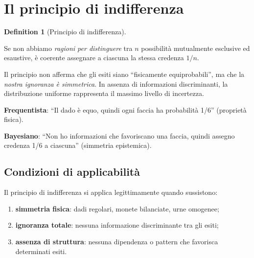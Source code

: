 \documentclass[
  letterpaper,
  DIV=11,
  numbers=noendperiod,
  oneside]{scrreprt}
\providecommand{\tightlist}{%
  \setlength{\itemsep}{0pt}\setlength{\parskip}{0pt}}
\theoremstyle{definition}
\theoremstyle{plain}
\theoremstyle{definition}
\newtheorem{definition}{Definition}[chapter]
\theoremstyle{remark}
\begin{document}
\section{Il principio di
indifferenza}\label{il-principio-di-indifferenza}

\begin{definition}[Principio di
indifferenza]\protect\hypertarget{def-principle-indifference}{}\label{def-principle-indifference}

Se non abbiamo \emph{ragioni per distinguere} tra \(n\) possibilità
mutualmente esclusive ed esaustive, è coerente assegnare a ciascuna la
stessa credenza \(1/n\).

\end{definition}

Il principio non afferma che gli esiti siano ``fisicamente
equiprobabili'', ma che la \emph{nostra ignoranza è simmetrica}. In
assenza di informazioni discriminanti, la distribuzione uniforme
rappresenta il massimo livello di incertezza.

\begin{tcolorbox}[enhanced jigsaw, arc=.35mm, breakable, colbacktitle=quarto-callout-important-color!10!white, opacityback=0, toprule=.15mm, rightrule=.15mm, colback=white, opacitybacktitle=0.6, leftrule=.75mm, coltitle=black, bottomtitle=1mm, left=2mm, toptitle=1mm, title=\textcolor{quarto-callout-important-color}{\faExclamation}\hspace{0.5em}{Distinzione cruciale}, titlerule=0mm, bottomrule=.15mm, colframe=quarto-callout-important-color-frame]

\textbf{Frequentista}: ``Il dado è equo, quindi ogni faccia ha
probabilità 1/6'' (proprietà fisica).

\textbf{Bayesiano}: ``Non ho informazioni che favoriscano una faccia,
quindi assegno credenza 1/6 a ciascuna'' (simmetria epistemica).

\end{tcolorbox}

\subsection{Condizioni di
applicabilità}\label{condizioni-di-applicabilituxe0}

Il principio di indifferenza si applica legittimamente quando
sussistono:

\begin{enumerate}
\def\labelenumi{\arabic{enumi}.}
\tightlist
\item
  \textbf{simmetria fisica}: dadi regolari, monete bilanciate, urne
  omogenee;
\item
  \textbf{ignoranza totale}: nessuna informazione discriminante tra gli
  esiti;
\item
  \textbf{assenza di struttura}: nessuna dipendenza o pattern che
  favorisca determinati esiti.
\end{enumerate}
\end{document}
